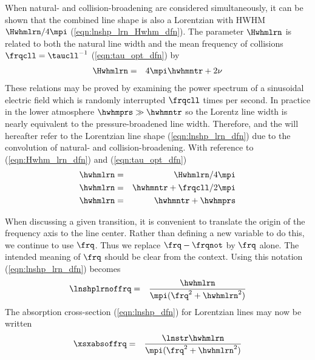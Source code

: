 \documentclass[12pt]{article}
\begin{document}
When natural- and collision-broadening are considered simultaneously,
it can be shown that the combined line shape is also a Lorentzian with
HWHM $\Hwhmlrn/4\mpi$ (\ref{eqn:lnshp_lrn_Hwhm_dfn}).
The parameter $\Hwhmlrn$ is related to both the natural line width and
the mean frequency of collisions $\frqcll = \taucll^{-1}$
(\ref{eqn:tau_opt_dfn}) by
\begin{eqnarray}
\Hwhmlrn & = & 4\mpi\hwhmntr + 2 \nu
\label{eqn:Hwhm_lrn_dfn}
\end{eqnarray}
These relations may be proved by examining the power spectrum of a
sinusoidal electric field which is randomly interrupted $\frqcll$ times
per second. 
In practice in the lower atmosphere $\hwhmprs \gg \hwhmntr$ so the
Lorentz line width is nearly equivalent to the pressure-broadened
line width.
Therefore,  and the  will hereafter refer to the Lorentzian line shape
(\ref{eqn:lnshp_lrn_dfn}) due to the convolution of natural- and
collision-broadening.  
With reference to (\ref{eqn:Hwhm_lrn_dfn}) and
(\ref{eqn:tau_opt_dfn}) 
\begin{eqnarray}
\hwhmlrn & = & \Hwhmlrn/4\mpi \nonumber \nonumber \\
\hwhmlrn & = & \hwhmntr + \frqcll / 2\mpi \nonumber \\
\hwhmlrn & = & \hwhmntr + \hwhmprs
\label{eqn:hwhm_lrn_dfn}
\end{eqnarray}

When discussing a given transition, it is convenient to translate the
origin of the frequency axis to the line center.
Rather than defining a new variable to do this, we continue to use
$\frq$.
Thus we replace $\frq - \frqnot$ by $\frq$ alone. 
The intended meaning of $\frq$ should be clear from the context.
Using this notation (\ref{eqn:lnshp_lrn_dfn}) becomes
\begin{eqnarray}
\lnshplrnoffrq & = & \frac{\hwhmlrn}{\mpi(\frq^{2} + \hwhmlrn^{2})}
\label{eqn:lnshp_lrn_dfn2}
\end{eqnarray}
The absorption cross-section (\ref{eqn:lnshp_dfn}) for
Lorentzian lines may now be written
\begin{eqnarray}
\xsxabsoffrq & = & \frac{\lnstr \hwhmlrn}{\mpi(\frq^{2} + \hwhmlrn^{2})}
\label{eqn:abs_lrn_dfn}
\end{eqnarray}
\end{document}
